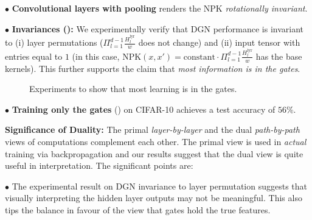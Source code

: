 $\bullet$ \textbf{Convolutional layers with pooling} renders the NPK \emph{rotationally invariant}. 

$\bullet$ \textbf{Invariances ():} We experimentally verify that DGN performance is invariant to (i) layer permutations ($\Pi_{l=1}^{d-1} \frac{H^{\text{lyr}}_l}{w}$ does not change) and (ii) input tensor with entries equal to $1$ (in this case, NPK$(x,x')= \text{constant}\cdot \Pi_{l=1}^{d-1} \frac{H^{\text{lyr}}_l}{w}$ has the base kernels). This further supports the claim that \emph{most information is in the gates}. %
\FloatBarrier
\begin{figure}[h]
\centering
{}
\caption{Experiments to show that most learning is in the gates.}
\label{fig:permutations}
\end{figure}

$\bullet$ \textbf{Training only the gates} () on CIFAR-10 achieves a test accuracy of $56\%$.

\textbf{Significance of Duality:} The primal \emph{layer-by-layer} and the dual \emph{path-by-path} views of computations complement each other. The primal view is used in \emph{actual} training via backpropagation and our results suggest that the dual view is quite useful in interpretation. The significant points are:

$\bullet$ The experimental result on DGN invariance to layer permutation suggests that visually interpreting the hidden layer outputs may not be meaningful. This also tips the balance in favour of the view that gates hold the true features.

